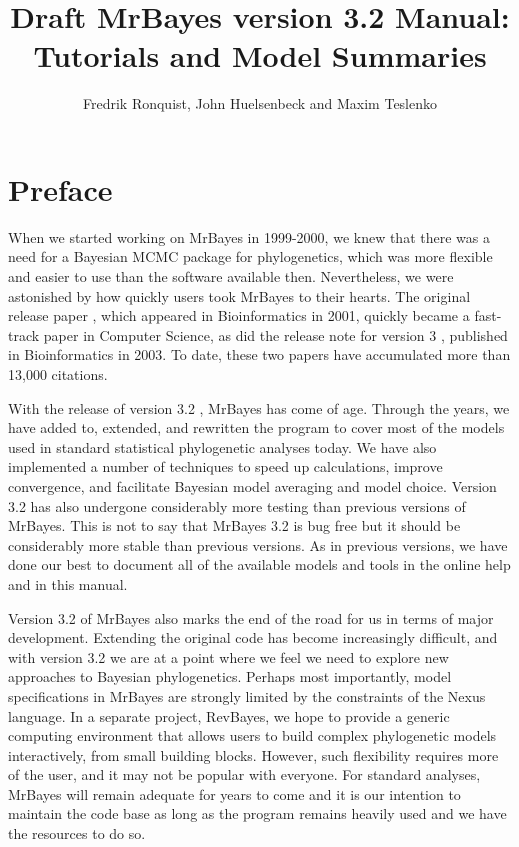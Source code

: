 \documentclass[12pt]{book}
\begin{document}
\title{Draft MrBayes version 3.2 Manual: Tutorials and Model Summaries}
\author{Fredrik Ronquist, John Huelsenbeck and Maxim Teslenko}
\maketitle

\newpage
\tableofcontents

\newpage

\frontmatter

\chapter{Preface}
\label{preface}

When we started working on MrBayes in 1999-2000, we knew that there was a need
for a Bayesian MCMC package for phylogenetics, which was more flexible and easier to use than the
software available then. Nevertheless, we were astonished by how quickly users took MrBayes
to their hearts. The original release paper \citep{huelsenbeck01c}, which appeared in Bioinformatics
in 2001, quickly became a fast-track paper in Computer Science, as did the release note for
version 3  \citep{ronquist03}, published in Bioinformatics in 2003. To date, these
two papers have accumulated more than 13,000 citations.

With the release of version 3.2 \citep{ronquist11}, MrBayes has come of age. Through
the years, we have added to, extended, and rewritten the program to cover most of the models used
in standard statistical phylogenetic analyses today. We have also implemented a number of techniques
to speed up calculations, improve convergence, and facilitate Bayesian model averaging and model
choice. Version 3.2 has also undergone considerably more testing than previous versions of MrBayes.
This is not to say that MrBayes 3.2 is bug free but it should be considerably more stable than previous
versions. As in previous versions, we have done our best to document all of the available models and
tools in the online help and in this manual. 

Version 3.2 of MrBayes also marks the end of the road for us in terms of major development.
Extending the original code has become increasingly difficult, and with version 3.2 we are at a point
where we feel we need to explore new approaches to Bayesian phylogenetics. Perhaps most importantly,
model specifications in MrBayes are strongly limited by the constraints of the Nexus language. In a
separate project, RevBayes, we hope to provide a generic computing environment that allows users to
build complex phylogenetic models interactively, from small building blocks. However, such flexibility
requires more of the user, and it may not be popular with everyone. For standard analyses, MrBayes
will remain adequate for years to come and it is our intention to maintain the code base as long as
the program remains heavily used and we have the resources to do so.
\end{document}
